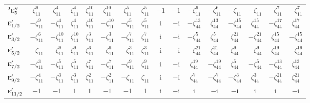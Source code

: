 \documentclass[10pt,a4paper]{article}
\makeatletter
\def\grouprule#1#2{\noalign{\marks\LTgroupmarks{\the\belowrulesep}\nobreak\vskip#1%
  \vskip\aboverulesep}\multispan\LT@cols\unskip{\leaders\hrule\@height#2\hfill\kern\z@}\cr
  \noalign{\penalty\LTrulebreak\vskip\belowrulesep\global\@lastruleclass\z@}}
\numberwithin{equation}{section}
\newcommand{\irr}[1]{\text{\normalfont\scshape #1}}
\newcommand{\conjpair}[1]{{}^{#1}}
\newcommand{\iunit}{\mathrm{i}}
\newcommand{\rootunity}[1]{\zeta_{#1}}
\makeatother
\begin{document}
{\begin{longtable}{@{}lccccccccccccccc@{}}
$\conjpair{2}\irr{e}_{5}''$ & $\rootunity{11}^{9}$ & $\rootunity{11}^{4}$ & $\rootunity{11}^{4}$ & $\rootunity{11}^{10}$ & $\rootunity{11}^{10}$ & $\rootunity{11}^{5}$ & $\rootunity{11}^{5}$ & $-1$ & $-1$ & $-\rootunity{11}^{6}$ & $-\rootunity{11}^{6}$ & $-\rootunity{11}$ & $-\rootunity{11}$ & $-\rootunity{11}^{7}$ & $-\rootunity{11}^{7}$\\
\grouprule{0pt}{\lightrulewidth}
$\irr{e}_{1/2}'$ & $-\rootunity{11}^{9}$ & $-\rootunity{11}^{4}$ & $\rootunity{11}^{4}$ & $\rootunity{11}^{10}$ & $-\rootunity{11}^{10}$ & $-\rootunity{11}^{5}$ & $\rootunity{11}^{5}$ & $\iunit{}$ & $-\iunit{}$ & $-\rootunity{44}^{13}$ & $\rootunity{44}^{13}$ & $-\rootunity{44}^{15}$ & $\rootunity{44}^{15}$ & $-\rootunity{44}^{17}$ & $\rootunity{44}^{17}$\\
$\irr{e}_{3/2}'$ & $-\rootunity{11}^{6}$ & $-\rootunity{11}^{10}$ & $\rootunity{11}^{10}$ & $\rootunity{11}^{3}$ & $-\rootunity{11}^{3}$ & $-\rootunity{11}^{7}$ & $\rootunity{11}^{7}$ & $\iunit{}$ & $-\iunit{}$ & $-\rootunity{44}^{5}$ & $\rootunity{44}^{5}$ & $\rootunity{44}^{21}$ & $-\rootunity{44}^{21}$ & $\rootunity{44}^{15}$ & $-\rootunity{44}^{15}$\\
$\irr{e}_{5/2}'$ & $-\rootunity{11}$ & $-\rootunity{11}^{9}$ & $\rootunity{11}^{9}$ & $\rootunity{11}^{6}$ & $-\rootunity{11}^{6}$ & $-\rootunity{11}^{3}$ & $\rootunity{11}^{3}$ & $\iunit{}$ & $-\iunit{}$ & $-\rootunity{44}^{21}$ & $\rootunity{44}^{21}$ & $\rootunity{44}^{9}$ & $-\rootunity{44}^{9}$ & $\rootunity{44}^{19}$ & $-\rootunity{44}^{19}$\\
$\irr{e}_{7/2}'$ & $-\rootunity{11}^{3}$ & $-\rootunity{11}^{5}$ & $\rootunity{11}^{5}$ & $\rootunity{11}^{7}$ & $-\rootunity{11}^{7}$ & $-\rootunity{11}^{9}$ & $\rootunity{11}^{9}$ & $\iunit{}$ & $-\iunit{}$ & $\rootunity{44}^{19}$ & $-\rootunity{44}^{19}$ & $\rootunity{44}^{5}$ & $-\rootunity{44}^{5}$ & $-\rootunity{44}^{13}$ & $\rootunity{44}^{13}$\\
$\irr{e}_{9/2}'$ & $-\rootunity{11}^{4}$ & $-\rootunity{11}^{3}$ & $\rootunity{11}^{3}$ & $\rootunity{11}^{2}$ & $-\rootunity{11}^{2}$ & $-\rootunity{11}$ & $\rootunity{11}$ & $\iunit{}$ & $-\iunit{}$ & $\rootunity{44}^{7}$ & $-\rootunity{44}^{7}$ & $-\rootunity{44}^{3}$ & $\rootunity{44}^{3}$ & $-\rootunity{44}^{21}$ & $\rootunity{44}^{21}$\\
$\irr{e}_{11/2}'$ & $-1$ & $-1$ & $1$ & $1$ & $-1$ & $-1$ & $1$ & $\iunit{}$ & $-\iunit{}$ & $\iunit{}$ & $-\iunit{}$ & $-\iunit{}$ & $\iunit{}$ & $\iunit{}$ & $-\iunit{}$\\

\end{longtable}}
\end{document}
